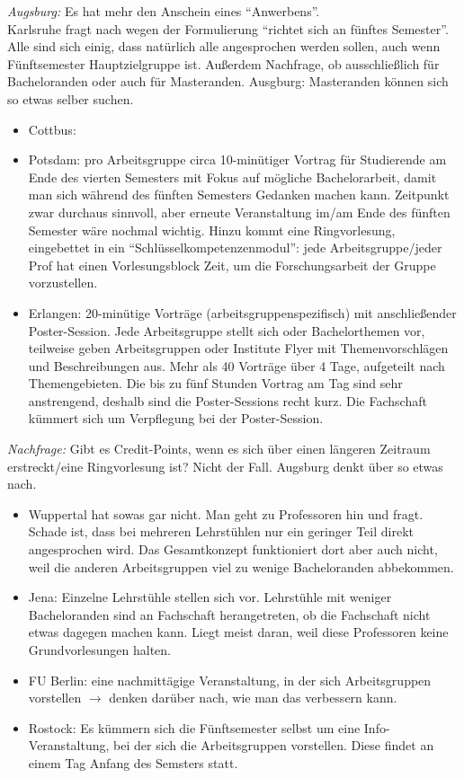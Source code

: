     \textit{Augsburg:} Es hat mehr den Anschein eines “Anwerbens”. \\
    Karlsruhe fragt nach wegen der Formulierung “richtet sich an fünftes Semester”. Alle sind sich einig, dass natürlich alle angesprochen werden sollen, auch wenn Fünftsemester Hauptzielgruppe ist. Außerdem Nachfrage, ob ausschließlich für Bacheloranden oder auch für Masteranden.
    Ausgburg: Masteranden können sich so etwas selber suchen.

    \begin{itemize}
      \item Cottbus:
      \item Potsdam: pro Arbeitsgruppe circa 10-minütiger Vortrag für Studierende am Ende des vierten Semesters mit Fokus auf mögliche Bachelorarbeit, damit man sich während des fünften Semesters Gedanken machen kann. Zeitpunkt zwar durchaus sinnvoll, aber erneute Veranstaltung im/am Ende des fünften Semester wäre nochmal wichtig. Hinzu kommt eine Ringvorlesung, eingebettet in ein “Schlüsselkompetenzenmodul”: jede Arbeitsgruppe/jeder Prof hat einen Vorlesungsblock Zeit, um die Forschungsarbeit der Gruppe vorzustellen.
      \item Erlangen: 20-minütige Vorträge (arbeitsgruppenspezifisch) mit anschließender Poster-Session. Jede Arbeitsgruppe stellt sich oder Bachelorthemen vor, teilweise geben Arbeitsgruppen oder Institute Flyer mit Themenvorschlägen und Beschreibungen aus.
      Mehr als 40 Vorträge über 4 Tage, aufgeteilt nach Themengebieten. Die bis zu fünf Stunden Vortrag am Tag sind sehr anstrengend, deshalb sind die Poster-Sessions recht kurz. Die Fachschaft kümmert sich um Verpflegung bei der Poster-Session.
    \end{itemize}

    \textit{Nachfrage:} Gibt es Credit-Points, wenn es sich über einen längeren Zeitraum erstreckt/eine Ringvorlesung ist? Nicht der Fall. Augsburg denkt über so etwas nach.

    \begin{itemize}
      \item Wuppertal hat sowas gar nicht. Man geht zu Professoren hin und fragt. Schade ist, dass bei mehreren Lehrstühlen nur ein geringer Teil direkt angesprochen wird. Das Gesamtkonzept funktioniert dort aber auch nicht, weil die anderen Arbeitsgruppen viel zu wenige Bacheloranden abbekommen.
      \item Jena: Einzelne Lehrstühle stellen sich vor. Lehrstühle mit weniger Bacheloranden sind an Fachschaft herangetreten, ob die Fachschaft nicht etwas dagegen machen kann. Liegt meist daran, weil diese Professoren keine Grundvorlesungen halten.
      \item FU Berlin: eine nachmittägige Veranstaltung, in der sich Arbeitsgruppen vorstellen $\rightarrow$ denken darüber nach, wie man das verbessern kann.
      \item Rostock: Es kümmern sich die Fünftsemester selbst um eine Info-Veranstaltung, bei der sich die Arbeitsgruppen vorstellen. Diese findet an einem Tag Anfang des Semsters statt.
    \end{itemize}

